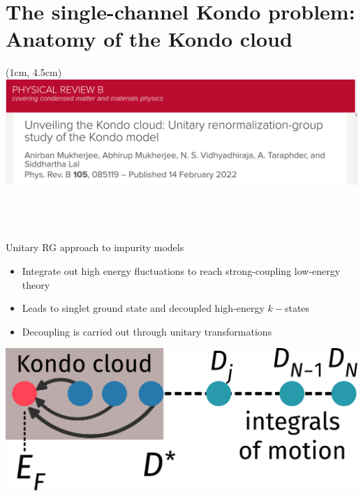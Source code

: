 \documentclass[10pt,aspectratio=169]{beamer}
\begin{document}
\section{The single-channel Kondo problem:\\ Anatomy of the Kondo cloud}
\begin{textblock*}{\textwidth}(1cm, 4.5cm)
\includegraphics[width=\textwidth]{kondocloud_prb.pdf}\\
\end{textblock*}
\subsection{~}

\begin{frame}{Unitary RG approach to impurity models}
\begin{minipage}{0.5\textwidth}
\begin{itemize}
	\item Integrate out \alert{high energy fluctuations} to reach strong-coupling low-energy theory
	\item Leads to \alert{singlet ground state} and decoupled high-energy \(k-\)states
	\item Decoupling is carried out through \alert{unitary transformations}
\end{itemize}

\end{minipage}
\hspace*{\fill}
\begin{minipage}{0.4\textwidth}
\includegraphics[width=\textwidth]{kondo_fp_1D.pdf}
\end{minipage}
	
\end{frame}
\end{document}
